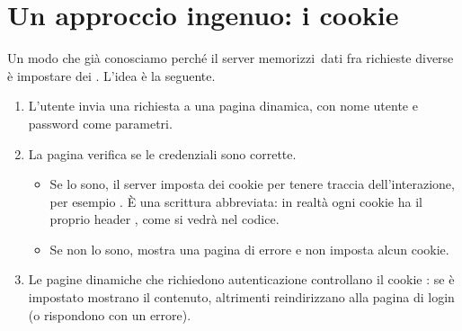 
\section{Un approccio ingenuo: i cookie}

Un modo che già conosciamo perché il server \guillemotleft memorizzi\guillemotright\ dati fra
richieste diverse è impostare dei . L'idea è la seguente.

\begin{enumerate}
  \item L'utente invia una richiesta a una pagina dinamica, con nome utente e
        password come parametri.
  \item La pagina verifica se le credenziali sono corrette.
    \begin{itemize}
      \item Se lo sono, il server imposta dei cookie per tenere traccia
            dell'interazione, per esempio
            . È una scrittura
            abbreviata: in realtà ogni cookie ha il proprio header
            , come si vedrà nel codice.
      \item Se non lo sono, mostra una pagina di errore e non imposta alcun
            cookie.
    \end{itemize}
  \item Le pagine dinamiche che richiedono autenticazione controllano il cookie
        : se è impostato mostrano il contenuto, altrimenti
        reindirizzano alla pagina di login (o rispondono con un errore).
\end{enumerate}

